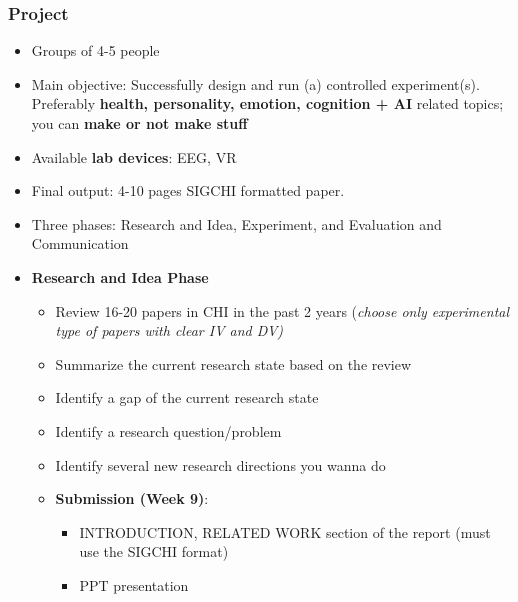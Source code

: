 \documentclass{beamer}
\begin{document}
\begin{frame}
\frametitle{Project}
\footnotesize
\begin{itemize}
	\item Groups of 4-5 people
	\item Main objective:  Successfully design and run (a) controlled experiment(s).   Preferably \textbf{health, personality, emotion, cognition + AI} related topics;  you can \textbf{make or not make stuff }
	\item Available \textbf{lab devices}: EEG, VR
	\item Final output: 4-10 pages SIGCHI formatted paper.
	\item Three phases: Research and Idea, Experiment, and Evaluation and Communication
	\item \textbf{Research and Idea Phase}
	\begin{itemize}
		\item Review 16-20 papers in CHI in the past 2 years (\textit{choose only experimental type of papers with clear IV and DV)}
		\item Summarize the current research state based on the review
		\item Identify a gap of the current research state
		\item Identify a research question/problem
		\item Identify several new research directions you wanna do
		\item \textbf{Submission (Week 9)}:
		\begin{itemize}
			\item  INTRODUCTION, RELATED WORK section of the report (must use the SIGCHI format)
			\item PPT presentation
		\end{itemize}
	\end{itemize}
\end{itemize}
\end{frame}
\end{document}
